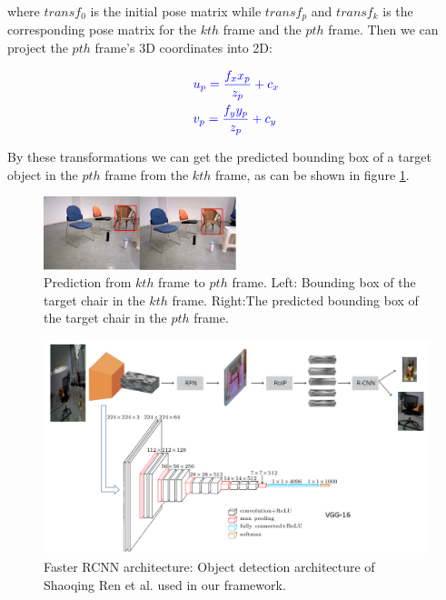 \documentclass[conference]{IEEEtran}
\begin{document}
where $transf_{0}$ is the initial pose matrix while $transf_{p}$ and $transf_{k}$ is the corresponding pose matrix for the $kth$ frame and the $pth$ frame. Then we can project the  $pth$ frame's  3D coordinates into 2D:
\begin{small}
	\begin{align}
	&{\color{blue}u_{p}=\frac{f_{x} x_{p}}{z_{p}}+c_{x}} \\
	&{\color{blue}v_{p}=\frac{f_{y} y_{p}}{z_{p}}+c_{y} }
	\end{align}
\end{small}
By these transformations we can get the predicted bounding box of a target object in the $pth$ frame from the $kth$ frame, as can be shown in figure \ref{fig:chair}. 
\begin{figure}[htb]
	\centering
	\includegraphics[width=0.5\textwidth]{pic/fig4.png}
	\centering
	\caption{Prediction from $kth$ frame to $pth$ frame. Left: Bounding box of the target chair in the $kth$ frame. Right:The predicted bounding box of the target chair in the $pth$ frame.}
	\label{fig:chair}
\end{figure}  

\begin{figure}[htb]
	\centering
	\includegraphics[width=1\textwidth]{pic/fig3.png}
	\centering
	\caption{{\color{blue}Faster RCNN architecture: Object detection architecture of Shaoqing Ren et al. \cite{ren2015faster} used in our framework.}}
	\label{fig:CNN architecture}
\end{figure}  
\end{document}
